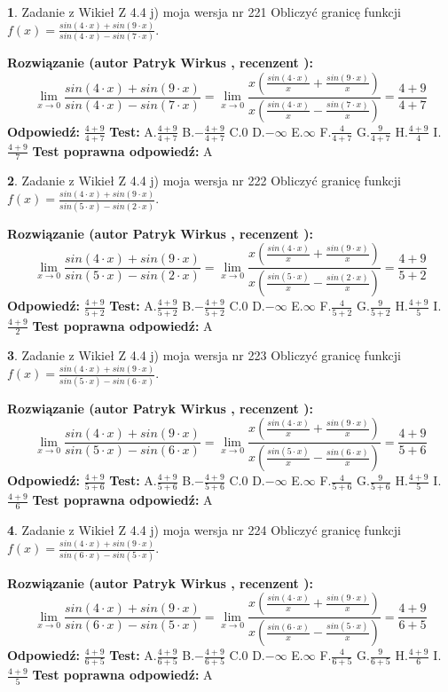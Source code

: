 \documentclass[12pt, a4paper]{article}
\theoremstyle{definition} %
\newtheorem{zad}{}
\newcommand{\zadStart}[1]{\begin{zad}#1\newline}
\newcommand{\zadStop}{\end{zad}}
\newcommand{\rozwStart}[2]{\noindent \textbf{Rozwiązanie (autor #1 , recenzent #2): }\newline}
\newcommand{\rozwStop}{\newline}
\newcommand{\odpStart}{\noindent \textbf{Odpowiedź:}\newline}
\newcommand{\odpStop}{\newline}
\newcommand{\testStart}{\noindent \textbf{Test:}\newline}
\newcommand{\testStop}{\newline}
\newcommand{\kluczStart}{\noindent \textbf{Test poprawna odpowiedź:}\newline}
\newcommand{\kluczStop}{\newline}
\begin{document}
\zadStart{Zadanie z Wikieł Z 4.4 j) moja wersja nr 221}
Obliczyć granicę funkcji $f(x)=\frac{sin(4\cdot x) +sin(9\cdot x)}{sin(4\cdot x) -sin(7\cdot x)}$.
\zadStop
\rozwStart{Patryk Wirkus}{}
$$\lim\limits_{x\to 0}\frac{sin(4\cdot x) +sin(9\cdot x)}{sin(4\cdot x) -sin(7\cdot x)}=\lim\limits_{x\to 0}\frac{x(\frac{sin(4\cdot x)}{x}+\frac{sin(9\cdot x)}{x})}{x(\frac{sin(4\cdot x)}{x}-\frac{sin(7\cdot x)}{x})}=\frac{4+9}{4+7}$$
\rozwStop
\odpStart
$\frac{4+9}{4+7}$
\odpStop
\testStart
A.$\frac{4+9}{4+7}$
B.$-\frac{4+9}{4+7}$
C.$0$
D.$-\infty$
E.$\infty$
F.$\frac{4}{4+7}$
G.$\frac{9}{4+7}$
H.$\frac{4+9}{4}$
I.$\frac{4+9}{7}$
\testStop
\kluczStart
A
\kluczStop



\zadStart{Zadanie z Wikieł Z 4.4 j) moja wersja nr 222}
Obliczyć granicę funkcji $f(x)=\frac{sin(4\cdot x) +sin(9\cdot x)}{sin(5\cdot x) -sin(2\cdot x)}$.
\zadStop
\rozwStart{Patryk Wirkus}{}
$$\lim\limits_{x\to 0}\frac{sin(4\cdot x) +sin(9\cdot x)}{sin(5\cdot x) -sin(2\cdot x)}=\lim\limits_{x\to 0}\frac{x(\frac{sin(4\cdot x)}{x}+\frac{sin(9\cdot x)}{x})}{x(\frac{sin(5\cdot x)}{x}-\frac{sin(2\cdot x)}{x})}=\frac{4+9}{5+2}$$
\rozwStop
\odpStart
$\frac{4+9}{5+2}$
\odpStop
\testStart
A.$\frac{4+9}{5+2}$
B.$-\frac{4+9}{5+2}$
C.$0$
D.$-\infty$
E.$\infty$
F.$\frac{4}{5+2}$
G.$\frac{9}{5+2}$
H.$\frac{4+9}{5}$
I.$\frac{4+9}{2}$
\testStop
\kluczStart
A
\kluczStop



\zadStart{Zadanie z Wikieł Z 4.4 j) moja wersja nr 223}
Obliczyć granicę funkcji $f(x)=\frac{sin(4\cdot x) +sin(9\cdot x)}{sin(5\cdot x) -sin(6\cdot x)}$.
\zadStop
\rozwStart{Patryk Wirkus}{}
$$\lim\limits_{x\to 0}\frac{sin(4\cdot x) +sin(9\cdot x)}{sin(5\cdot x) -sin(6\cdot x)}=\lim\limits_{x\to 0}\frac{x(\frac{sin(4\cdot x)}{x}+\frac{sin(9\cdot x)}{x})}{x(\frac{sin(5\cdot x)}{x}-\frac{sin(6\cdot x)}{x})}=\frac{4+9}{5+6}$$
\rozwStop
\odpStart
$\frac{4+9}{5+6}$
\odpStop
\testStart
A.$\frac{4+9}{5+6}$
B.$-\frac{4+9}{5+6}$
C.$0$
D.$-\infty$
E.$\infty$
F.$\frac{4}{5+6}$
G.$\frac{9}{5+6}$
H.$\frac{4+9}{5}$
I.$\frac{4+9}{6}$
\testStop
\kluczStart
A
\kluczStop



\zadStart{Zadanie z Wikieł Z 4.4 j) moja wersja nr 224}
Obliczyć granicę funkcji $f(x)=\frac{sin(4\cdot x) +sin(9\cdot x)}{sin(6\cdot x) -sin(5\cdot x)}$.
\zadStop
\rozwStart{Patryk Wirkus}{}
$$\lim\limits_{x\to 0}\frac{sin(4\cdot x) +sin(9\cdot x)}{sin(6\cdot x) -sin(5\cdot x)}=\lim\limits_{x\to 0}\frac{x(\frac{sin(4\cdot x)}{x}+\frac{sin(9\cdot x)}{x})}{x(\frac{sin(6\cdot x)}{x}-\frac{sin(5\cdot x)}{x})}=\frac{4+9}{6+5}$$
\rozwStop
\odpStart
$\frac{4+9}{6+5}$
\odpStop
\testStart
A.$\frac{4+9}{6+5}$
B.$-\frac{4+9}{6+5}$
C.$0$
D.$-\infty$
E.$\infty$
F.$\frac{4}{6+5}$
G.$\frac{9}{6+5}$
H.$\frac{4+9}{6}$
I.$\frac{4+9}{5}$
\testStop
\kluczStart
A
\kluczStop
\end{document}

